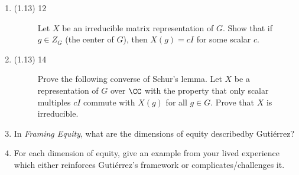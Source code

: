 \documentclass{math174}
\date{Monday, February 20}
\author{}
\begin{document}
\begin{enumerate}
\item
  \begin{description}
  \item[(1.13) 12] Let \(X\) be an irreducible matrix representation
    of \(G\).  Show that if \(g \in Z_G\) (the center of \(G\)), then
    \(X(g) = cI\) for some scalar \(c.\)

    \begin{solution}

    \end{solution}
  \end{description}
\item
  \begin{description}
  \item[(1.13) 14] Prove the following converse of Schur's lemma.  Let
    \(X\) be a representation of \(G\) over \(\CC\) with the property
    that only scalar multiples \(cI\) commute with \(X(g)\) for all
    \(g \in G\).  Prove that \(X\) is irreducible.

    \begin{solution}

    \end{solution}
  \end{description}
\item In \textit{Framing Equity}, what are the dimensions of equity
  describedby Guti\'errez?

  \begin{solution}

  \end{solution}

\item For each dimension of equity, give an example from your lived
  experience which either reinforces Guti\'errez's framework or
  complicates/challenges it.

  \begin{solution}

  \end{solution}
\end{enumerate}
\end{document}
